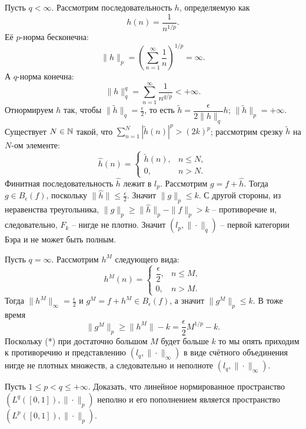 \begin{solve}
\begin{enumerate}
        Пусть $q < \infty$.
        Рассмотрим последовательность $h$, определяемую как
        \[
            h(n) = \dfrac{1}{n^{1/p}}.
        \]
        Её $p$-норма бесконечна:
        \[
            \|h\|_p = \left(\sum\limits_{n = 1}^{\infty} \dfrac{1}{n}\right)^{1/p} = \infty.
        \]
        А $q$-норма конечна:
        \[
            \|h\|_q^q = \sum\limits_{n = 1}^{\infty} \frac{1}{n^{q/p}} < +\infty.
        \]
        Отнормируем $h$ так, чтобы $\|\tilde{h}\|_q = \frac{\epsilon}{2}$, то есть $\tilde{h} = \dfrac{\epsilon}{2\|h\|_q}h$; $\|\tilde{h}\|_p = +\infty$. Существует $N \in \mathbb{N}$ такой, что $\sum\limits_{n = 1}^N |\tilde{h}(n)|^p > (2k)^p$; рассмотрим срезку $\tilde{h}$ на $N$-ом элементе:
        \[
            \hat{h}(n) = \begin{cases}
                             \tilde{h}(n), & n \leq N, \\
                             0, & n > N.
            \end{cases}
        \]
        Финитная последовательность $\hat{h}$ лежит в $l_p$. Рассмотрим $g = f + \hat{h}$. Тогда $g \in B_\epsilon(f)$, поскольку $\|\hat{h}\| \leq \frac{\epsilon}{2}$. Значит $\|g\|_p \leq k$. С другой стороны, из неравенства треугольника, $\|g\|_p \geq \|\hat{h}\|_p - \|f\|_p > k$ -- противоречие и, следовательно, $F_k$ -- нигде не плотно. Значит $(l_p, \|\cdot\|_q)$ -- первой категории Бэра и не может быть полным.


        Пусть $q = \infty$. Рассмотрим $h^M$ следующего вида:
        \[
            h^M(n) = \begin{cases}
                         \dfrac{\epsilon}{2}, & n \leq M, \\
                         0, & n > M.
            \end{cases}
        \]
        Тогда $\|h^M\|_\infty = \frac{\epsilon}{2}$ и $g^M = f + h^M \in B_\epsilon(f)$, а значит $\|g^M\|_p \leq k$. В тоже время
        \[
            \|g^M\|_p \geq \|h^M\| - k = \frac{\epsilon}{2}M^{1/p} - k. \tag{*}
        \]
        Поскольку (*) при достаточно большом $M$ будет больше $k$ то мы опять приходим к противоречию и представлению $(l_q, \|\cdot\|_\infty)$ в виде счётного объединения нигде не плотных множеств, а следовательно и неполноте $(l_q, \|\cdot\|_\infty)$.
    \end{enumerate}
\end{solve}
\begin{task}[T14]
    Пусть $1 \leq p < q \leq +\infty$. Доказать, что линейное нормированное пространство $(L^q([0, 1]), \|\cdot\|_p)$ неполно и его пополнением является пространство $(L^p([0, 1]), \|\cdot\|_p)$.
\end{task}
